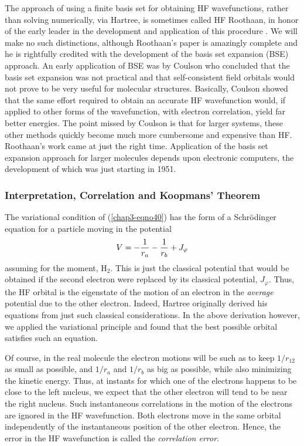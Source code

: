 The approach of using a finite basis set for obtaining HF
wavefunctions, rather than solving numerically, via Hartree, is
sometimes called HF Roothaan, in honor of the early leader in the
development and application of this procedure \cite{chap3-ref12}.  We
will make no such distinctions, although Roothaan's paper is amazingly
complete and he is rightfully credited with the development of the
basis set expansion (BSE) approach.  An early application of BSE was
by Coulson \cite{chap3-ref13} who concluded that the basis set
expansion was not practical and that self-consistent field orbitals
would not prove to be very useful for molecular structures.
Basically, Coulson showed that the same effort required to obtain an
accurate HF wavefunction would, if applied to other forms of the
wavefunction, with electron correlation, yield far better energies.
The point missed by Coulson is that for larger systems, these other
methods quickly become much more cumbersome and expensive than HF.
Roothaan's work came at just the right time.  Application of the basis
set expansion approach for larger molecules depends upon electronic
computers, the development of which was just starting in 1951.

\subsubsection{Interpretation, Correlation and Koopmans' Theorem}

The variational condition of (\ref{chap3-eqno40}) has the form of a
Schr\"odinger equation for a particle moving in the potential
\begin{equation}
V = - {1 \over r_a} - {1 \over r_b}  + J_{\varphi}
\end{equation}
assuming for the moment, H$_2$.  This is just the classical potential
that would be obtained if the second electron were replaced by its
classical potential, $J_{\varphi}$.  Thus, the HF orbital is the
eigenstate of the motion of an electron in the \emph{average}
potential due to the other electron.  Indeed, Hartree originally
derived his equations from just such classical considerations. In the
above derivation however, we applied the variational principle and
found that the best possible orbital satisfies such an equation.

Of course, in the real molecule the electron motions will be such as
to keep $1/r_{12}$ as small as possible, and $1/r_a$ and $1/r_b$ as
big as possible, while also minimizing the kinetic energy.  Thus, at
instants for which one of the electrons happens to be close to the
left nucleus, we expect that the other electron will tend to be near
the right nucleus. Such instantaneous correlations in the motion of
the electrons are ignored in the HF wavefunction.  Both electrons move
in the same orbital independently of the instantaneous position of the
other electron.  Hence, the error in the HF wavefunction is called the
\emph{correlation error}.

